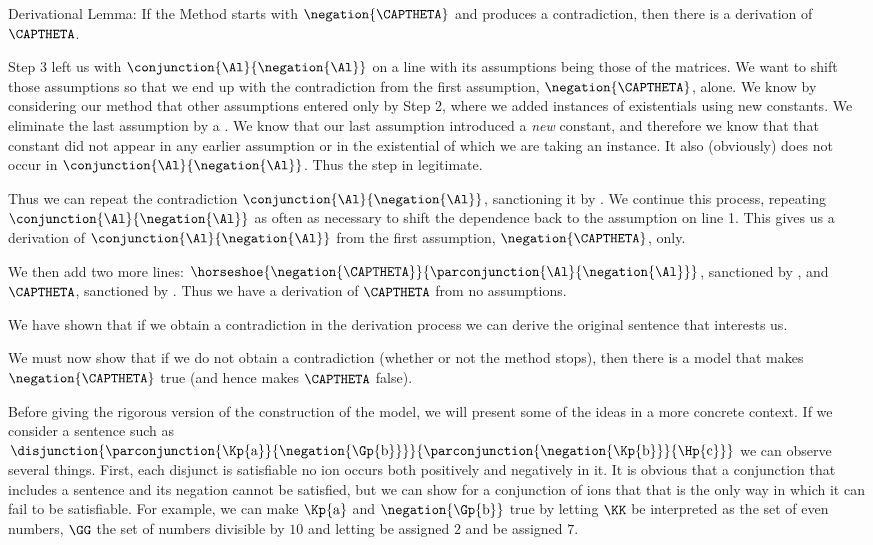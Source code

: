 \begin{THEOREM}{ Derivational Lemma:}
If the Method starts with $\negation{\CAPTHETA}$ and produces a contradiction, then there is a derivation of $\CAPTHETA$.
\end{THEOREM}
\begin{PROOF}
Step 3 left us with $\conjunction{\Al}{\negation{\Al}}$ on a line with its assumptions being those of the matrices. 
We want to shift those assumptions so that we end up with the contradiction from the first assumption, $\negation{\CAPTHETA}$, alone.
We know by considering our method that other assumptions entered only by Step 2, where we added instances of existentials using new constants. 
We eliminate the last assumption by a . 
We know that our last assumption introduced a \emph{new} constant, and therefore we know that that constant did not appear in any earlier assumption or in the existential of which we are taking an instance.
It also (obviously) does not occur in $\conjunction{\Al}{\negation{\Al}}$.
Thus the  step in legitimate. 

Thus we can repeat the contradiction $\conjunction{\Al}{\negation{\Al}}$, sanctioning it by . 
We continue this process, repeating $\conjunction{\Al}{\negation{\Al}}$ as often as necessary to shift the dependence back to the assumption on line 1. 
This gives us a derivation of $\conjunction{\Al}{\negation{\Al}}$ from the first assumption, $\negation{\CAPTHETA}$, only. 

We then add two more lines: $\horseshoe{\negation{\CAPTHETA}}{\parconjunction{\Al}{\negation{\Al}}}$, sanctioned by , and $\CAPTHETA$, sanctioned by . 
Thus we have a derivation of $\CAPTHETA$ from no assumptions. 
\end{PROOF}

We have shown that if we obtain a contradiction in the derivation process we can derive the original sentence that interests us.


We must now show that if we do not obtain a contradiction (whether or not the method stops), then there is a model that makes $\negation{\CAPTHETA}$ true (and hence makes $\CAPTHETA$ false).

Before giving the rigorous version of the construction of the model, we will present some of the ideas in a more concrete context. 
If we consider a sentence such as $\disjunction{\parconjunction{\Kp{\constant{a}}}{\negation{\Gp{\constant{b}}}}}{\parconjunction{\negation{\Kp{\constant{b}}}}{\Hp{\constant{c}}}}$ we can observe several things. 
First, each disjunct is satisfiable \Iff no ion occurs both positively and negatively in it. 
It is obvious that a conjunction that includes a sentence and its negation cannot be satisfied, but we can show for a conjunction of ions that that is the only way in which it can fail to be satisfiable. 
For example, we can make $\Kp{\constant{a}}$ and $\negation{\Gp{\constant{b}}}$ true by letting $\KK$ be interpreted as the set of even numbers, $\GG$ the set of numbers divisible by $10$ and letting  be assigned $2$ and  be assigned $7$. 


